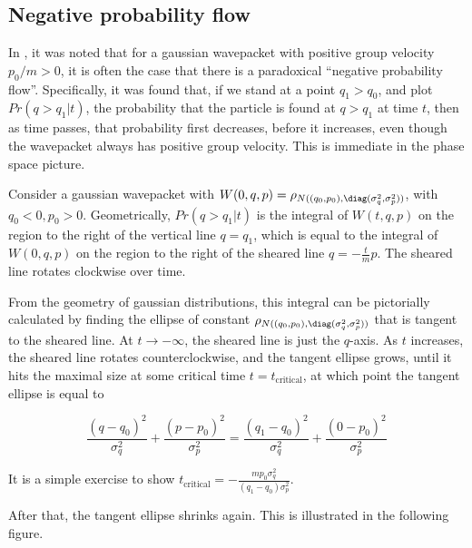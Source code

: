 \subsection{Negative probability flow}

In \cite{villanuevaNegativeFlowProbability2020; goussevCommentNegativeFlow2020}, it was noted that for a gaussian
wavepacket with positive group velocity $p_0 / m > 0$, it is often the
case that there is a paradoxical ``negative probability flow''.
Specifically, it was found that, if we stand at a point $q_1 > q_0$,
and plot $Pr(q > q_1 | t)$, the probability that the particle is found
at $q > q_1$ at time $t$, then as time passes, that probability
first decreases, before it increases, even though the wavepacket always
has positive group velocity. This is immediate in the phase space
picture.

Consider a gaussian wavepacket with
$W(0, q, p) = \rho_{N ((q_0, p_0), \diag(\sigma_q^2, \sigma_p^2))}$,
with $q_0 < 0, p_0 > 0$. Geometrically, $Pr(q > q_1 | t)$ is the
integral of $W(t, q, p)$ on the region to the right of the vertical
line $q = q_1$, which is equal to the integral of $W(0, q, p)$ on
the region to the right of the sheared line $q = -\frac{t}{m} p$. The
sheared line rotates clockwise over time.

From the geometry of gaussian distributions, this integral can be
pictorially calculated by finding the ellipse of constant
$\rho_{N ((q_0, p_0), \diag(\sigma_q^2, \sigma_p^2))}$ that is tangent
to the sheared line. At $t \to -\infty$, the sheared line is just the
$q$-axis. As $t$ increases, the sheared line rotates
counterclockwise, and the tangent ellipse grows, until it hits the
maximal size at some critical time $t = t_{\text{critical}}$, at which
point the tangent ellipse is equal to

$$
\frac{(q-q_0)^2}{\sigma_q^2} + \frac{(p-p_0)^2}{\sigma_p^2} = \frac{(q_1-q_0)^2}{\sigma_q^2} + \frac{(0-p_0)^2}{\sigma_p^2}
$$

It is a simple exercise to show
$t_{\text{critical}} = -\frac{mp_0 \sigma_q^2}{(q_1- q_0) \sigma_p^2}$.

After that, the tangent ellipse shrinks again. This is illustrated in
the following figure.

